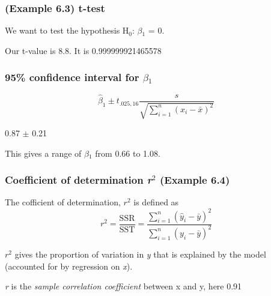 \documentclass[11pt]{article}
\begin{document}
\subsubsection{(Example 6.3) t-test}
\label{sec-1-2-2}


We want to test the hypothesis H$_0$: $\beta$$_1$ = 0.



Our t-value is 8.8. It
is 0.999999921465578 
\subsubsection{95\% confidence interval for $\beta$$_1$}
\label{sec-1-2-3}


\[
\hat\beta_{1} \pm t_{.025,16}\frac{s}{\sqrt{\sum_{i=1}^{n} (x_i
-\bar{x})^2}}
\]




 0.87 $\pm$
 0.21

This gives a range of $\beta$$_1$ from 0.66 to 1.08.
\subsubsection{Coefficient of determination \emph{r$^2$} (Example 6.4)}
\label{sec-1-2-4}

 
 The cofficient of determination, $r^2$ is defined as $$r^2 =
 \frac{\mathrm{SSR}}{\mathrm{SST}} = \frac{\sum_{i=1}^n (\hat{y}_i -
 \bar{y})^2}{\sum_{i=1}^n ({y}_i - \bar{y})^2}$$
 



 $r^2$ gives the proportion of variation in \emph{y} that is explained by
 the model (accounted for by regression on \emph{x}).

 \emph{r} is the \emph{sample correlation coefficient} between x and y, here
 0.91
\end{document}

